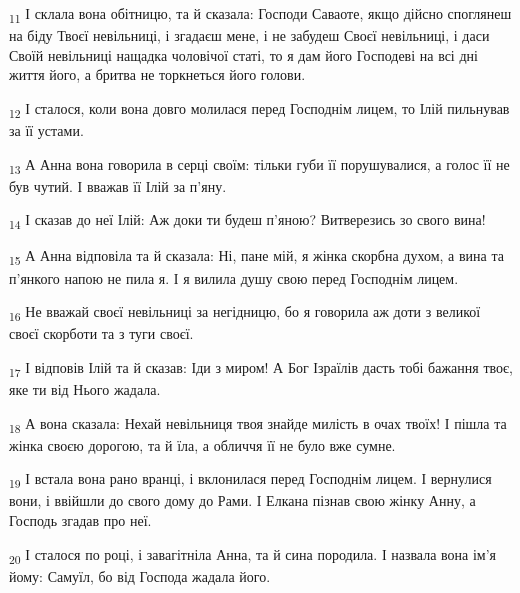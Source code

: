 \begin{tcolorbox}
\textsubscript{11} І склала вона обітницю, та й сказала: Господи Саваоте, якщо дійсно споглянеш на біду Твоєї невільниці, і згадаєш мене, і не забудеш Своєї невільниці, і даси Своїй невільниці нащадка чоловічої статі, то я дам його Господеві на всі дні життя його, а бритва не торкнеться його голови.
\end{tcolorbox}
\begin{tcolorbox}
\textsubscript{12} І сталося, коли вона довго молилася перед Господнім лицем, то Ілій пильнував за її устами.
\end{tcolorbox}
\begin{tcolorbox}
\textsubscript{13} А Анна вона говорила в серці своїм: тільки губи її порушувалися, а голос її не був чутий. І вважав її Ілій за п'яну.
\end{tcolorbox}
\begin{tcolorbox}
\textsubscript{14} І сказав до неї Ілій: Аж доки ти будеш п'яною? Витверезись зо свого вина!
\end{tcolorbox}
\begin{tcolorbox}
\textsubscript{15} А Анна відповіла та й сказала: Ні, пане мій, я жінка скорбна духом, а вина та п'янкого напою не пила я. І я вилила душу свою перед Господнім лицем.
\end{tcolorbox}
\begin{tcolorbox}
\textsubscript{16} Не вважай своєї невільниці за негідницю, бо я говорила аж доти з великої своєї скорботи та з туги своєї.
\end{tcolorbox}
\begin{tcolorbox}
\textsubscript{17} І відповів Ілій та й сказав: Іди з миром! А Бог Ізраїлів дасть тобі бажання твоє, яке ти від Нього жадала.
\end{tcolorbox}
\begin{tcolorbox}
\textsubscript{18} А вона сказала: Нехай невільниця твоя знайде милість в очах твоїх! І пішла та жінка своєю дорогою, та й їла, а обличчя її не було вже сумне.
\end{tcolorbox}
\begin{tcolorbox}
\textsubscript{19} І встала вона рано вранці, і вклонилася перед Господнім лицем. І вернулися вони, і ввійшли до свого дому до Рами. І Елкана пізнав свою жінку Анну, а Господь згадав про неї.
\end{tcolorbox}
\begin{tcolorbox}
\textsubscript{20} І сталося по році, і завагітніла Анна, та й сина породила. І назвала вона ім'я йому: Самуїл, бо від Господа жадала його.
\end{tcolorbox}

